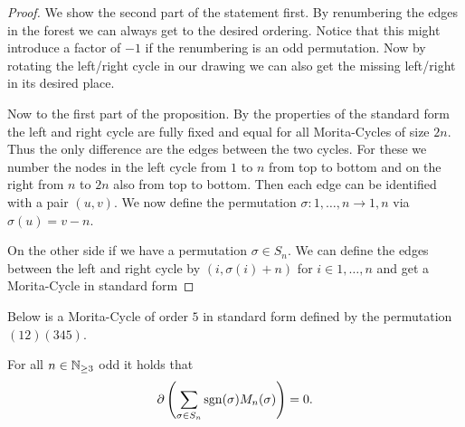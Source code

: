 \begin{proof}
	We show the second part of the statement first.
	By renumbering the edges in the forest we can always get to the desired ordering. Notice that this might introduce a factor of $-1$
	if the renumbering is an odd permutation.
	Now by rotating the left/right cycle in our drawing we can also get the missing left/right in its desired place.

	Now to the first part of the proposition.
	By the properties of the standard form the left and right cycle are fully fixed and equal for all Morita-Cycles of size $2 n$.
	Thus the only difference are the edges between the two cycles.
	For these we number the nodes in the left cycle from $1$ to $n$ from top to bottom
	and on the right from $n$ to  $2 n$ also from top to bottom. Then each edge can be identified with a pair $(u,v)$.
	We now define the permutation $\sigma: {1,\ldots,n} \to {1,n}$ via $\sigma(u) = v - n$.

	On the other side if we have a permutation $\sigma \in S_{n}$. We can define the edges between the left and right cycle
	by $(i,\sigma(i) +n)$ for $i \in {1,\ldots,n}$ and get a Morita-Cycle in standard form
\end{proof}

\begin{eg}
	Below is a Morita-Cycle of order $5$ in standard form defined by the permutation $(12)(345)$.
\end{eg}

\begin{theorem}
	For all $n \in \mathbb{N}_{\geq 3}$ odd it holds that 
	\[
		\partial\left(\sum_{\sigma \in S_{n}} \operatorname{sgn}(\sigma) M_{n}(\sigma)\right) = 0
	.\] 
\end{theorem}

